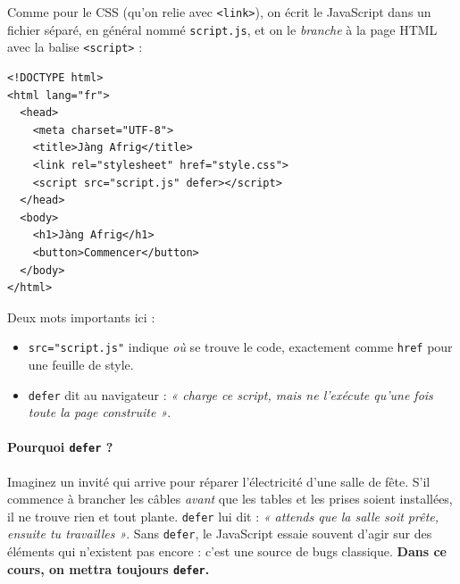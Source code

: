 \documentclass[11pt,a4paper]{article}
\newcommand{\code}[1]{\texttt{#1}}
\begin{document}
Comme pour le CSS (qu'on relie avec \code{<link>}), on écrit le JavaScript dans un fichier séparé, en général nommé \code{script.js}, et on le \emph{branche} à la page HTML avec la balise \code{<script>} :

\begin{lstlisting}[style=html]
<!DOCTYPE html>
<html lang="fr">
  <head>
    <meta charset="UTF-8">
    <title>Jàng Afrig</title>
    <link rel="stylesheet" href="style.css">
    <script src="script.js" defer></script>
  </head>
  <body>
    <h1>Jàng Afrig</h1>
    <button>Commencer</button>
  </body>
</html>
\end{lstlisting}

Deux mots importants ici :
\begin{itemize}[leftmargin=*]
  \item \code{src="script.js"} indique \emph{où} se trouve le code, exactement comme \code{href} pour une feuille de style.
  \item \code{defer} dit au navigateur : \emph{« charge ce script, mais ne l'exécute qu'une fois toute la page construite »}.
\end{itemize}

\paragraph{Pourquoi \code{defer} ?} Imaginez un invité qui arrive pour réparer l'électricité d'une salle de fête. S'il commence à brancher les câbles \emph{avant} que les tables et les prises soient installées, il ne trouve rien et tout plante. \code{defer} lui dit : \emph{« attends que la salle soit prête, ensuite tu travailles »}. Sans \code{defer}, le JavaScript essaie souvent d'agir sur des éléments qui n'existent pas encore : c'est une source de bugs classique. \textbf{Dans ce cours, on mettra toujours \code{defer}.}
\end{document}
